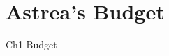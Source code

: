 % 
%





\setlength{\parindent}{0pt}

\usepackage{epigraph}
\usepackage{tocloft}




\newpage\thispagestyle{EmptyPage}
\mbox{}\newpage


\setcounter{tocdepth}{3}
\tableofcontents
\pagebreak






\newpage
{}

\newpage
\setlength{\parskip}{1em}

\part{Astrea's Budget}
{Ch1-Budget	}



